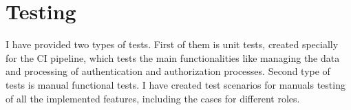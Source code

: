 \chapter{Testing}\label{chapter6}I have provided two types of tests. First of them is unit tests, created specially for the CI pipeline, which tests the main functionalities like managing the data and processing of authentication and  authorization processes. Second type of tests is manual functional tests. I have created test scenarios for manuals testing of all the implemented features, including the cases for different roles.







